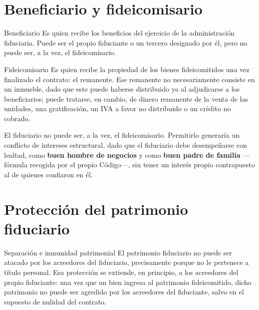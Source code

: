 \documentclass[12pt,oneside]{book}
\begin{document}
\section{Beneficiario y fideicomisario}

\begin{definition}{Beneficiario}
Es quien recibe los beneficios del ejercicio de la administración fiduciaria. Puede ser el propio fiduciante o un tercero designado por él, pero no puede ser, a la vez, el fideicomisario.
\end{definition}

\begin{definition}{Fideicomisario}
Es quien recibe la propiedad de los bienes fideicomitidos una vez finalizado el contrato: el remanente. Ese remanente no necesariamente consiste en un inmueble, dado que este puede haberse distribuido ya al adjudicarse a los beneficiarios; puede tratarse, en cambio, de dinero remanente de la venta de las unidades, una gratificación, un IVA a favor no distribuido o un crédito no cobrado.
\end{definition}

\begin{important}
El fiduciario no puede ser, a la vez, el fideicomisario. Permitirlo generaría un conflicto de intereses estructural, dado que el fiduciario debe desempeñarse con lealtad, como \textbf{buen hombre de negocios} y como \textbf{buen padre de familia} —fórmula recogida por el propio Código—, sin tener un interés propio contrapuesto al de quienes confiaron en él.
\end{important}

\section{Protección del patrimonio fiduciario}

\begin{definition}{Separación e inmunidad patrimonial}
El patrimonio fiduciario no puede ser atacado por los acreedores del fiduciario, precisamente porque no le pertenece a título personal. Esa protección se extiende, en principio, a los acreedores del propio fiduciante: una vez que un bien ingresa al patrimonio fideicomitido, dicho patrimonio no puede ser agredido por los acreedores del fiduciante, salvo en el supuesto de nulidad del contrato.
\end{definition}
\end{document}
